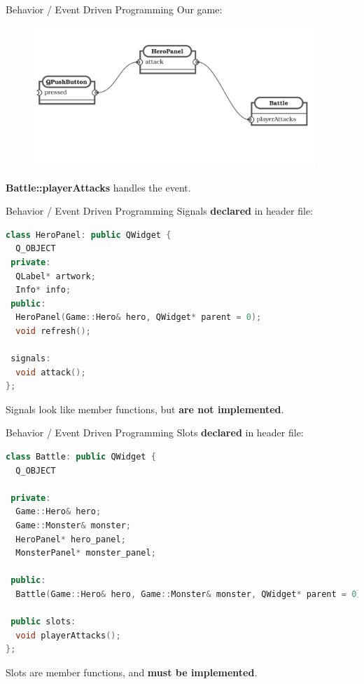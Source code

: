 \documentclass[11pt]{beamer}
\renewcommand{\emph}[1]{\textbf{#1}}
\begin{document}
\begin{frame}{Behavior / Event Driven Programming}
 Our game:
 \begin{figure}
  \includegraphics[width=0.95\textwidth]{assets/event-driven-programming-3}
 \end{figure}
 \emph{Battle::playerAttacks} handles the event.
\end{frame}

\begin{frame}[fragile]{Behavior / Event Driven Programming}
 Signals \emph{declared} in header file:
 \begin{lstlisting}[language=C++]
class HeroPanel: public QWidget {
  Q_OBJECT
 private:
  QLabel* artwork;
  Info* info;
 public:
  HeroPanel(Game::Hero& hero, QWidget* parent = 0);
  void refresh();
  
 signals:
  void attack();
};
\end{lstlisting}
 Signals look like member functions, but \emph{are not implemented}.
\end{frame}

\begin{frame}[fragile]{Behavior / Event Driven Programming}
 Slots \emph{declared} in header file:
 \begin{lstlisting}[language=C++]
class Battle: public QWidget {
  Q_OBJECT

 private:
  Game::Hero& hero;
  Game::Monster& monster;
  HeroPanel* hero_panel;
  MonsterPanel* monster_panel;

 public:
  Battle(Game::Hero& hero, Game::Monster& monster, QWidget* parent = 0);
  
 public slots:
  void playerAttacks();
};
\end{lstlisting}
 Slots are member functions, and \emph{must be implemented}.
\end{frame}
\end{document}

